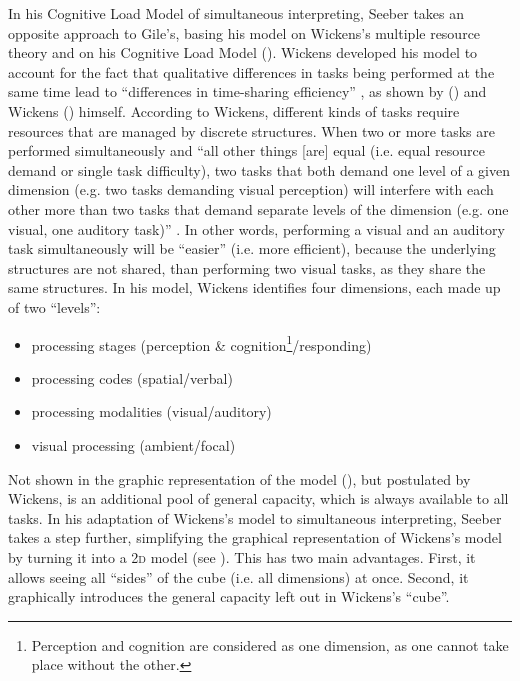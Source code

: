 \documentclass[output=paper]{langsci/langscibook}
\begin{document}
In his Cognitive Load Model of simultaneous interpreting, Seeber takes an opposite approach to Gile’s, basing his model on Wickens’s multiple resource theory and on his Cognitive Load Model (\citeyear{Wickens1984, Wickens2002}). Wickens developed his model to account for the fact that qualitative differences in tasks being performed at the same time lead to ``differences in time-sharing efficiency'' \citep[162]{Wickens2002}, as shown by \citeauthor{Kantowitz1976} (\citeyear{Kantowitz1976}) and Wickens (\citeyear{Wickens1976}) himself. According to Wickens, different kinds of tasks require resources that are managed by discrete structures. When two or more tasks are performed simultaneously and ``all other things [are] equal (i.e. equal resource demand or single task difficulty), two tasks that both demand one level of a given dimension (e.g. two tasks demanding visual perception) will interfere with each other more than two tasks that demand separate levels of the dimension (e.g. one visual, one auditory task)'' \citep{Wickens2002}. In other words, performing a visual and an auditory task simultaneously will be ``easier'' (i.e. more efficient), because the underlying structures are not shared, than performing two visual tasks, as they share the same structures. In his model, Wickens identifies four dimensions, each made up of two ``levels'':
\begin{itemize}
\item processing stages (perception \& cognition\footnote{Perception and cognition are considered as one dimension, as one cannot take place without the other.}\slash responding)
\item processing codes (spatial\slash verbal)
\item processing modalities (visual\slash auditory)
\item visual processing (ambient\slash focal)
\end{itemize}

Not shown in the graphic representation of the model (), but postulated by Wickens, is an additional pool of general capacity, which is always available to all tasks. In his adaptation of Wickens’s model to simultaneous interpreting, Seeber takes a step further, simplifying the graphical representation of Wickens’s model by turning it into a \textsc{2d} model (see ). This has two main advantages. First, it allows seeing all ``sides'' of the cube (i.e. all dimensions) at once. Second, it graphically introduces the general capacity left out in Wickens’s ``cube''. 
\end{document}
